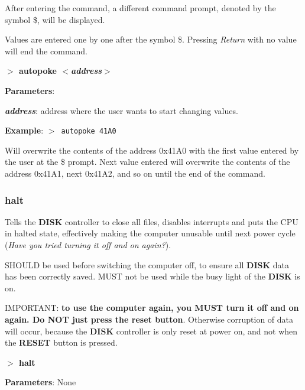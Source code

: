         After entering the command, a different command prompt, denoted by
        the symbol \$, will be displayed.

        Values are entered one by one after the symbol \$. Pressing 
        \textit{Return} with no value will end the command.

        \hspace{1.9cm}\textbf{$>$ autopoke \textit{$<$address$>$}}

        \textbf{Parameters}:

        \hspace{1cm}\textbf{\textit{address}}: address where the user wants
        to start changing values.

        \textbf{Example}: \texttt{$>$ autopoke 41A0}

        Will overwrite the contents of the address 0x41A0 with the first
        value entered by the user at the \$ prompt. Next value entered will
        overwrite the contents of the address 0x41A1, next 0x41A2, and so on
        until the end of the command.

        \subsubsection{{halt}}
        \label{cmd:halt}
        
        Tells the \textbf{DISK} controller to close all files, disables
        interrupts and puts the CPU in halted state, effectively making the
        computer unusable until next power cycle (\textit{Have you tried turning
        it off and on again?}).

        SHOULD be used before switching the computer off, to ensure all
        \textbf{DISK} data has been correctly saved. MUST not be used while the
        busy light of the \textbf{DISK} is on.

        IMPORTANT: \textbf{to use the computer again, you MUST turn it off and
        on again. Do NOT just press the reset button}. Otherwise corruption of
        data will occur, because the \textbf{DISK} controller is only reset at
        power on, and not when the \textbf{RESET} button is pressed.

        \hspace{1.9cm}\textbf{$>$ halt}

        \textbf{Parameters}: None

